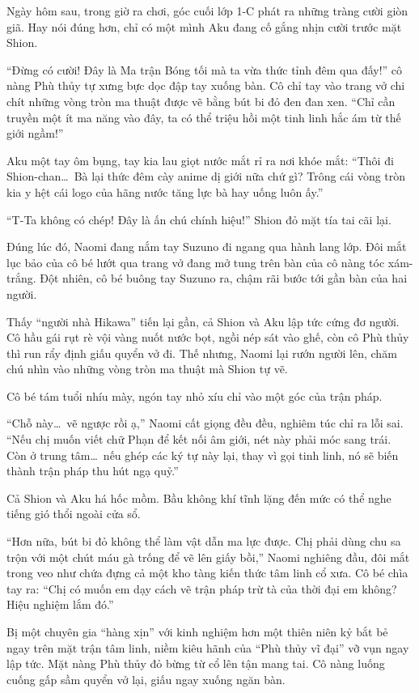 \documentclass[../main.tex]{subfiles}
\begin{document}
Ngày hôm sau, trong giờ ra chơi, góc cuối lớp 1-C phát ra những tràng cười giòn giã. Hay nói đúng hơn, chỉ có một mình Aku đang cố gắng nhịn cười trước mặt Shion.

``Đừng có cười! Đây là Ma trận Bóng tối mà ta vừa thức tỉnh đêm qua đấy!'' cô nàng Phù thủy tự xưng bực dọc đập tay xuống bàn. Cô chỉ tay vào trang vở chi chít những vòng tròn ma thuật được vẽ bằng bút bi đỏ đen đan xen. ``Chỉ cần truyền một ít ma năng vào đây, ta có thể triệu hồi một tinh linh hắc ám từ thế giới ngầm!''

Aku một tay ôm bụng, tay kia lau giọt nước mắt rỉ ra nơi khóe mắt: ``Thôi đi Shion-chan\dots\ Bà lại thức đêm cày anime dị giới nữa chứ gì? Trông cái vòng tròn kia y hệt cái logo của hãng nước tăng lực bà hay uống luôn ấy.''

``T-Ta không có chép! Đây là ấn chú chính hiệu!'' Shion đỏ mặt tía tai cãi lại.

Đúng lúc đó, Naomi đang nắm tay Suzuno đi ngang qua hành lang lớp. Đôi mắt lục bảo của cô bé lướt qua trang vở đang mở tung trên bàn của cô nàng tóc xám-trắng. Đột nhiên, cô bé buông tay Suzuno ra, chậm rãi bước tới gần bàn của hai người.

Thấy ``người nhà Hikawa'' tiến lại gần, cả Shion và Aku lập tức cứng đơ người. Cô hầu gái rụt rè vội vàng nuốt nước bọt, ngồi nép sát vào ghế, còn cô Phù thủy thì run rẩy định giấu quyển vở đi. Thế nhưng, Naomi lại rướn người lên, chăm chú nhìn vào những vòng tròn ma thuật mà Shion tự vẽ.

Cô bé tám tuổi nhíu mày, ngón tay nhỏ xíu chỉ vào một góc của trận pháp.

``Chỗ này\dots\ vẽ ngược rồi ạ,'' Naomi cất giọng đều đều, nghiêm túc chỉ ra lỗi sai. ``Nếu chị muốn viết chữ Phạn để kết nối âm giới, nét này phải móc sang trái. Còn ở trung tâm\dots\ nếu ghép các ký tự này lại, thay vì gọi tinh linh, nó sẽ biến thành trận pháp thu hút ngạ quỷ.''

Cả Shion và Aku há hốc mồm. Bầu không khí tĩnh lặng đến mức có thể nghe tiếng gió thổi ngoài cửa sổ.

``Hơn nữa, bút bi đỏ không thể làm vật dẫn ma lực được. Chị phải dùng chu sa trộn với một chút máu gà trống để vẽ lên giấy bồi,'' Naomi nghiêng đầu, đôi mắt trong veo như chứa đựng cả một kho tàng kiến thức tâm linh cổ xưa. Cô bé chìa tay ra: ``Chị có muốn em dạy cách vẽ trận pháp trừ tà của thời đại em không? Hiệu nghiệm lắm đó.''

Bị một chuyên gia ``hàng xịn'' với kinh nghiệm hơn một thiên niên kỷ bắt bẻ ngay trên mặt trận tâm linh, niềm kiêu hãnh của ``Phù thủy vĩ đại'' vỡ vụn ngay lập tức. Mặt nàng Phù thủy đỏ bừng từ cổ lên tận mang tai. Cô nàng luống cuống gấp sầm quyển vở lại, giấu ngay xuống ngăn bàn.
\end{document}
